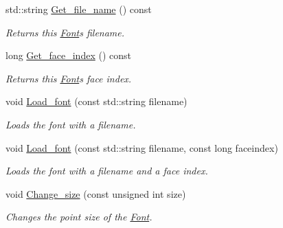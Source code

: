 \begin{DoxyCompactItemize}
std\+::string \hyperlink{classjetfuel_1_1draw_1_1Font_a497ce6fb60f71fdc8667c5a5ede81cca}{Get\+\_\+file\+\_\+name} () const
\begin{DoxyCompactList}\small\item\em Returns this \hyperlink{classjetfuel_1_1draw_1_1Font}{Font}\textquotesingle{}s filename. \end{DoxyCompactList}\item 
long \hyperlink{classjetfuel_1_1draw_1_1Font_ad0f24c27c3dcca9839e4ffc1603a1c54}{Get\+\_\+face\+\_\+index} () const
\begin{DoxyCompactList}\small\item\em Returns this \hyperlink{classjetfuel_1_1draw_1_1Font}{Font}\textquotesingle{}s face index. \end{DoxyCompactList}\item 
void \hyperlink{classjetfuel_1_1draw_1_1Font_a5b6bec15a5220e34f5138fe9f1abf72e}{Load\+\_\+font} (const std\+::string filename)
\begin{DoxyCompactList}\small\item\em Loads the font with a filename. \end{DoxyCompactList}\item 
void \hyperlink{classjetfuel_1_1draw_1_1Font_aac89368ac80b1dd5b7831f40af14ef2f}{Load\+\_\+font} (const std\+::string filename, const long faceindex)
\begin{DoxyCompactList}\small\item\em Loads the font with a filename and a face index. \end{DoxyCompactList}\item 
void \hyperlink{classjetfuel_1_1draw_1_1Font_a2a99e3273204f9dca27017c568f1eefe}{Change\+\_\+size} (const unsigned int size)
\begin{DoxyCompactList}\small\item\em Changes the point size of the \hyperlink{classjetfuel_1_1draw_1_1Font}{Font}. \end{DoxyCompactList}\end{DoxyCompactItemize}
